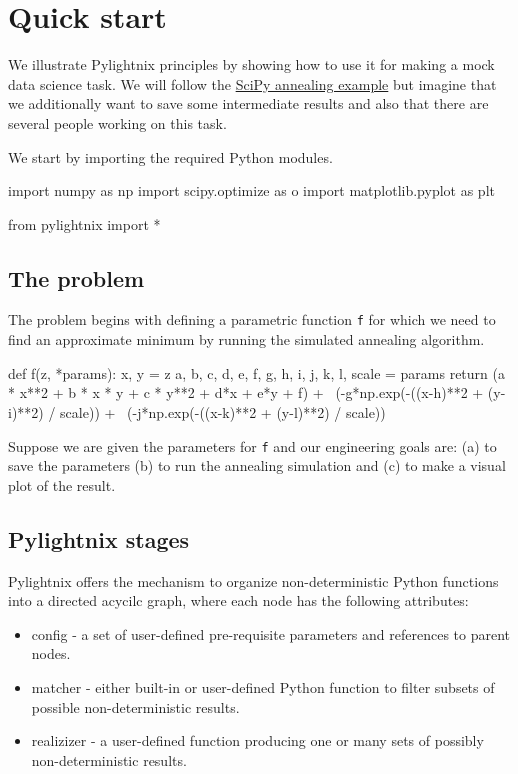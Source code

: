 \section{Quick start}

We illustrate Pylightnix principles by showing how to use it for making a mock
data science task. We will follow the
\href{https://docs.scipy.org/doc/scipy/reference/generated/scipy.optimize.dual_annealing.html}{SciPy
annealing example} but imagine that we additionally want to save some intermediate results
and also that there are several people working on this task.

We start by importing the required Python modules.

\begin{pythontexcode}
import numpy as np
import scipy.optimize as o
import matplotlib.pyplot as plt

from pylightnix import *
\end{pythontexcode}

\subsection{The problem}

The problem begins with defining a parametric function \texttt{f} for which we
need to find an approximate minimum by running the simulated annealing
algorithm.

\begin{pythontexcode}
def f(z, *params):
  x, y = z
  a, b, c, d, e, f, g, h, i, j, k, l, scale = params
  return (a * x**2 + b * x * y + c * y**2 + d*x + e*y + f) + \
         (-g*np.exp(-((x-h)**2 + (y-i)**2) / scale)) + \
         (-j*np.exp(-((x-k)**2 + (y-l)**2) / scale))
\end{pythontexcode}

Suppose we are given the parameters for \texttt{f} and our engineering goals
are: (a) to save the parameters (b) to run the annealing simulation and (c) to
make a visual plot of the result.

\subsection{Pylightnix stages}

Pylightnix offers the  mechanism to organize
non-deterministic Python functions into a directed acycilc graph, where each
node has the following attributes:

\begin{itemize}
  \item config - a set of user-defined pre-requisite parameters and references
    to parent nodes.
  \item matcher - either built-in or user-defined Python function to filter
    subsets of possible non-deterministic results.
  \item realizizer - a user-defined function producing one or many sets of
    possibly non-deterministic results.
\end{itemize}

